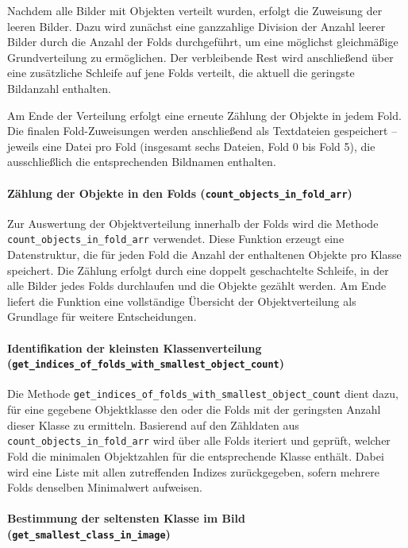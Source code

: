Nachdem alle Bilder mit Objekten verteilt wurden, erfolgt die Zuweisung der leeren Bilder. Dazu wird zunächst eine ganzzahlige Division der Anzahl leerer Bilder durch die Anzahl der Folds durchgeführt, um eine möglichst gleichmäßige Grundverteilung zu ermöglichen. Der verbleibende Rest wird anschließend über eine zusätzliche Schleife auf jene Folds verteilt, die aktuell die geringste Bildanzahl enthalten.

Am Ende der Verteilung erfolgt eine erneute Zählung der Objekte in jedem Fold. Die finalen Fold-Zuweisungen werden anschließend als Textdateien gespeichert – jeweils eine Datei pro Fold (insgesamt sechs Dateien, Fold 0 bis Fold 5), die ausschließlich die entsprechenden Bildnamen enthalten.

\paragraph{Zählung der Objekte in den Folds (\texttt{count\_objects\_in\_fold\_arr})}

Zur Auswertung der Objektverteilung innerhalb der Folds wird die Methode \texttt{count\_objects\_in\_fold\_arr} verwendet. Diese Funktion erzeugt eine Datenstruktur, die für jeden Fold die Anzahl der enthaltenen Objekte pro Klasse speichert. Die Zählung erfolgt durch eine doppelt geschachtelte Schleife, in der alle Bilder jedes Folds durchlaufen und die Objekte gezählt werden. Am Ende liefert die Funktion eine vollständige Übersicht der Objektverteilung als Grundlage für weitere Entscheidungen.

\paragraph{Identifikation der kleinsten Klassenverteilung (\texttt{get\_indices\_of\_folds\_with\_smallest\_object\_count})}

Die Methode \texttt{get\_indices\_of\_folds\_with\_smallest\_object\_count} dient dazu, für eine gegebene Objektklasse den oder die Folds mit der geringsten Anzahl dieser Klasse zu ermitteln. Basierend auf den Zähldaten aus \texttt{count\_objects\_in\_fold\_arr}  wird über alle Folds iteriert und geprüft, welcher Fold die minimalen Objektzahlen für die entsprechende Klasse enthält. Dabei wird eine Liste mit allen zutreffenden Indizes zurückgegeben, sofern mehrere Folds denselben Minimalwert aufweisen.

\paragraph{Bestimmung der seltensten Klasse im Bild (\texttt{get\_smallest\_class\_in\_image})}

